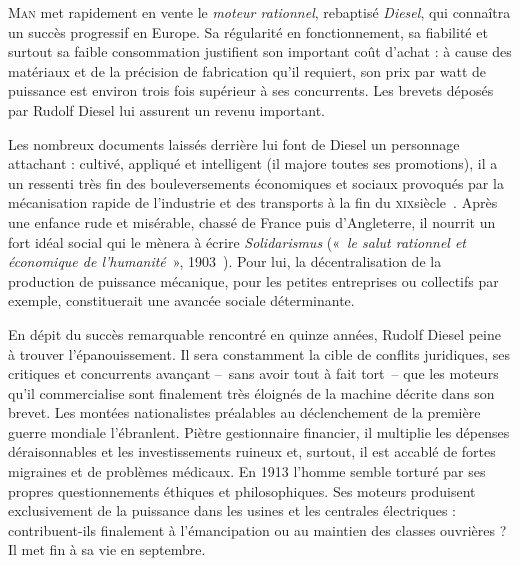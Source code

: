 	\textsc{Man} met rapidement en vente le \textit{moteur rationnel}, rebaptisé \textit{Diesel}, qui connaîtra un succès progressif en Europe. Sa régularité en fonctionnement, sa fiabilité et surtout sa faible consommation justifient son important coût d’achat : à cause des matériaux et de la précision de fabrication qu’il requiert, son prix par \si{watt} de puissance est environ trois fois supérieur à ses concurrents. Les brevets déposés par Rudolf Diesel lui assurent un revenu important.
	
	Les nombreux documents laissés derrière lui font de Diesel un personnage attachant : cultivé, appliqué et intelligent (il majore toutes ses promotions), il a un ressenti très fin des bouleversements économiques et sociaux provoqués par la mécanisation rapide de l’industrie et des transports à la fin du \textsc{xix}\ieme siècle~\cite{grosser1978,thomas1978,coltrane1997}. Après une enfance rude et misérable, chassé de France puis d’Angleterre, il nourrit un fort idéal social qui le mènera à écrire \textit{Solidarismus} («~\textit{le salut rationnel et économique de l’humanité}~», 1903~\cite{diesel1903}). Pour lui, la décentralisation de la production de puissance mécanique, pour les petites entreprises ou collectifs par exemple, constituerait une avancée sociale déterminante.
	
	En dépit du succès remarquable rencontré en quinze années, Rudolf Diesel peine à trouver l’épanouissement. Il sera constamment la cible de conflits juridiques, ses critiques et concurrents avançant --\ sans avoir tout à fait tort\ -- que les moteurs qu’il commercialise sont finalement très éloignés de la machine décrite dans son brevet. Les montées nationalistes préalables au déclenchement de la première guerre mondiale l’ébranlent. Piètre gestionnaire financier, il multiplie les dépenses déraisonnables et les investissements ruineux et, surtout, il est accablé de fortes migraines et de problèmes médicaux. En 1913 l’homme semble torturé par ses propres questionnements éthiques et philosophiques. Ses moteurs produisent exclusivement de la puissance dans les usines et les centrales électriques : contribuent-ils finalement à l’émancipation ou au maintien des classes ouvrières ? Il met fin à sa vie en septembre.
	
